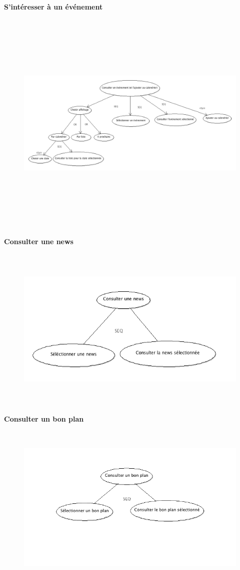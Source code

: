 \documentclass[a4paper, 11px]{article}
\begin{document}
\textbf{S'intéresser à un événement}
\begin{figure}[h!]
\includegraphics[width=18cm,height=11cm]{consulter_evenements.png}
\end{figure}
\vfill
\clearpage

\textbf{Consulter une news}
\vfill
\begin{figure}[h!]
\includegraphics[width=18cm,height=8cm]{consulter_news.png}
\end{figure}

\textbf{Consulter un bon plan}

\begin{figure}[h!]
\includegraphics[width=18cm,height=8cm]{consulter_bonplans.png}
\end{figure}
\end{document}
